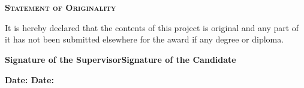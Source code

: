 \section*{}
{\scshape\Large\bfseries\hfil Statement of Originality \par}
\vspace{1cm}
\noindent
It is hereby declared that the contents of this project is original and any part of it has not been submitted elsewhere for the award if any degree or diploma.\par
\vspace{7cm}
\noindent
\underline{\hspace{5.5cm}} \hspace{3cm} \underline{\hspace{5.5cm}}
\par 
\vspace{.5cm}
\noindent
{\bfseries Signature of the Supervisor\hspace{3cm}Signature of the Candidate}
\par 
\vspace{.5cm}
\noindent
{\bfseries Date: \hspace{7.4cm}Date:}
\clearpage